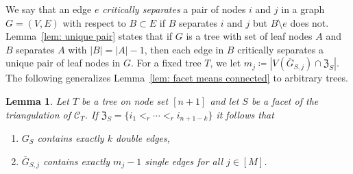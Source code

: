 \documentclass[11pt]{article}
\newtheorem{lemm}[theo]{Lemma}
\theoremstyle{definition}
\numberwithin{equation}{section}
\begin{document}
We say that an edge $e$ \emph{critically separates} a pair of nodes $i$ and $j$ in a graph $G = (V,E)$ with respect to $B\subset E$  if $B$ separates $i$ and $j$ but $B\setminus e$ does not. 
Lemma~\ref{lem: unique pair} states that if $G$ is a tree with set of leaf nodes $A$ and $B$ separates $A$ with $|B| = |A| - 1$, then each edge in $B$ critically separates a unique pair of leaf nodes in $G$. 
For a fixed tree $T$, we let $m_j \coloneqq |V(\overline{G}_{S,j})\cap \mathfrak{Z}_S|$.  
The following generalizes Lemma~\ref{lem: facet means connected} to arbitrary trees.
\begin{lemm}
\label{lem: facets means connected for trees}
Let $T$ be a tree on node set $[n+1]$ and let $S$ be a facet of the triangulation of $\mathcal{C}_T$.   
If $\mathfrak{Z}_S = \{i_1 <_r \cdots <_r i_{n+1-k}\}$ %
it follows that
\begin{enumerate}
    \item $G_S$ contains exactly $k$ double edges,
	




    \item $\overline{G}_{S,j}$ contains exactly $m_j-1$ single edges for all $j\in[M]$. 
\end{enumerate}
\end{lemm}
\end{document}
